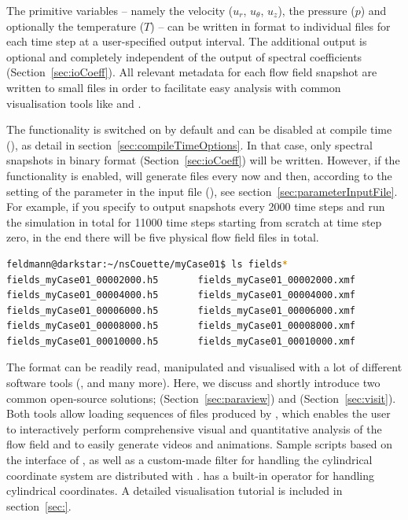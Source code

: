 \documentclass[a4paper, 11pt, DIV=11]{scrartcl}
\begin{document}
The primitive variables -- namely the velocity ($u_r$, $u_{\theta}$, $u_{z}$),
the pressure ($p$) and optionally the temperature ($T$) -- can be written in
\hdf format to individual files for each time step at a user-specified output
interval. The additional \hdf output is optional and completely independent of
the output of spectral coefficients (Section~\ref{sec:ioCoeff}). All relevant
metadata for each flow field snapshot are written to small \xmf files in order
to facilitate easy analysis with common visualisation tools like \paraview and
\visit. 
\par
The \hdf functionality is switched on by default and can be disabled at compile
time (), as detail in section~\ref{sec:compileTimeOptions}.
In that case, only spectral snapshots in binary format (Section~\ref{sec:ioCoeff})
will be written. However, if the \hdf functionality is enabled, \nsc will generate 
 files every now and then, according to the setting of the
 parameter in the input file (), see
section~\ref{sec:parameterInputFile}. For example, if you specify to output snapshots
every \num{2000} time steps and run the simulation in total for \num{11000} time steps
starting from scratch at time step zero, in the end there will be five physical flow
field files in total.
\begin{lstlisting}[language=bash]
feldmann@darkstar:~/nsCouette/myCase01$ ls fields*
fields_myCase01_00002000.h5       fields_myCase01_00002000.xmf
fields_myCase01_00004000.h5       fields_myCase01_00004000.xmf
fields_myCase01_00006000.h5       fields_myCase01_00006000.xmf
fields_myCase01_00008000.h5       fields_myCase01_00008000.xmf
fields_myCase01_00010000.h5       fields_myCase01_00010000.xmf
\end{lstlisting}
The \hdf format can be readily read, manipulated and visualised with a lot of different
software tools (\eg \python, \plplot and many more). Here, we discuss and shortly
introduce two common open-source solutions; \ie \paraview (Section~\ref{sec:paraview})
and \visit (Section~\ref{sec:visit}). Both tools allow loading sequences of \xmf files
produced by \nsc, which enables the user to interactively perform comprehensive visual
and quantitative analysis of the flow field and to easily generate videos and animations.
Sample scripts based on the \python interface of \visit, as well as a custom-made \paraview
filter for handling the cylindrical coordinate system are distributed with \nsc. \visit
has a built-in operator for handling cylindrical coordinates. A detailed visualisation
tutorial is included in section~\ref{sec:}.
\end{document}
